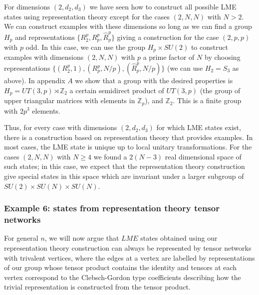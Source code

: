 \documentclass[12pt]{article}
\theoremstyle{definition}
\begin{document}
For dimensions $(2,d_2,d_3)$ we have seen how to construct all possible LME states using representation theory except for the cases $(2,N,N)$ with $N > 2$. We can construct examples with these dimensions so long as we can find a group $H_p$ and representations $\{R^p_2, R_p^p,\hat{R}_p^p\}$ giving a construction for the case $(2,p,p)$ with $p$ odd. In this case, we can use the group $H_p \times SU(2)$ to construct examples with dimensions $(2,N,N)$ with $p$ a prime factor of $N$ by choosing representations $\{(R^p_2,1), (R_p^p,N/p),(\hat{R}_p^p,N/p)\}$ (we can use $H_2 = S_3$ as above). In appendix $A$ we show that a group with the desired properties is $H_p = UT(3,p) \rtimes \mathbb{Z}_2$ a certain semidirect product of $UT(3,p)$ (the group of upper triangular matrices with elements in $\mathbb{Z}_p$), and $\mathbb{Z}_2$. This is a finite group with $2p^3$ elements.

Thus, for every case with dimensions $(2,d_2,d_3)$ for which LME states exist, there is a construction based on representation theory that provides examples. In most cases, the LME state is unique up to local unitary transformations. For the cases $(2,N,N)$ with $N \ge 4$ we found a $2(N-3)$ real dimensional space of such states; in this case, we expect that the representation theory construction give special states in this space which are invariant under a larger subgroup of $SU(2) \times SU(N) \times SU(N)$.

\subsubsection*{Example 6: states from representation theory tensor networks}

For general $n$, we will now argue that $LME$ states obtained using our representation theory construction can always be represented by tensor networks with trivalent vertices, where the edges at a vertex are labelled by representations of our group whose tensor product contains the identity and tensors at each vertex correspond to the Clebsch-Gordon type coefficients describing how the trivial representation is constructed from the tensor product.
\end{document}
